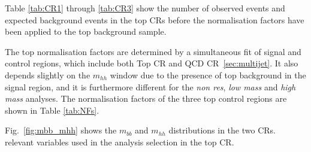 Table \ref{tab:CR1} through \ref{tab:CR3} show the number of observed
events and expected background events in the top CRs before the
normalisation factors have been applied to the top background sample.

The top normalisation factors are determined by a simultaneous fit  of
signal and control regions, which include both Top CR and QCD CR~\ref{sec:multijet}. It also depends slightly on the $m_{hh}$ window due to the presence of top background in the signal region, and it is furthermore different for the \emph{non  res}, \emph{low  mass} and \emph{high mass} analyses. The normalisation
factors of the three top control regions are shown in Table \ref{tab:NFs}.

Fig.~\ref{fig:mbb_mhh} shows the $m_{bb}$ and $m_{hh}$ distributions in the two CRs.%
relevant variables used in the analysis selection in the top CR.  

